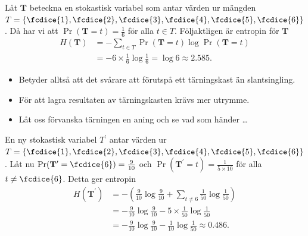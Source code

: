 \documentclass{beamer}
\let\stoch\mathbf{}
\begin{document}
\begin{frame}
  \begin{example}
    Låt \(\stoch T\) beteckna en stokastisk variabel som antar värden ur 
    mängden \(T = \{\fcdice{1}, \fcdice{2}, \fcdice{3}, \fcdice{4}, \fcdice{5}, 
      \fcdice{6}\}\).
    Då har vi att \(\Pr(\stoch T = t) = \frac{1}{6}\) för alla \(t\in T\).
    Följaktligen är entropin för \(\stoch T\)
    \begin{align*}
      H(\stoch T) &= -\sum_{t\in T} \Pr(\stoch T = t)\log\Pr(\stoch T = t) \\
      &= -6\times \frac{1}{6}\log\frac{1}{6} = \log 6 \approx 2.585.
    \end{align*}
  \end{example}
\end{frame}

\begin{frame}
  \begin{itemize}
    \item Betyder alltså att det svårare att förutspå ett tärningskast än 
      slantsingling.

    \item För att lagra resultaten av tärningskasten krävs mer utrymme.

    \item Låt oss förvanska tärningen en aning och se vad som händer \dots
  \end{itemize}
\end{frame}

\begin{frame}
  \begin{example}
    En ny stokastisk variabel \(T^\prime\) antar värden ur \(T = \{\fcdice{1}, 
      \fcdice{2}, \fcdice{3}, \fcdice{4}, \fcdice{5}, \fcdice{6}\}\).
    Låt nu \(\Pr(\stoch T^\prime = \fcdice{6}) = \frac{9}{10}\) och 
    \(\Pr(\stoch T^\prime = t) = \frac{1}{5\times 10}\) för alla \(t\neq 
      \fcdice{6}\).
    Detta ger entropin
    \begin{align*}
      H(\stoch T^\prime) &= -\left( \frac{9}{10}\log\frac{9}{10} + \sum_{t\neq 
      6} \frac{1}{50}\log\frac{1}{50} \right) \\
        &= -\frac{9}{10}\log\frac{9}{10} -5\times\frac{1}{50}\log\frac{1}{50} 
        \\
        &= -\frac{9}{10}\log\frac{9}{10} -\frac{1}{10}\log\frac{1}{50} \approx 
        0.486.
    \end{align*}
  \end{example}
\end{frame}
\end{document}
